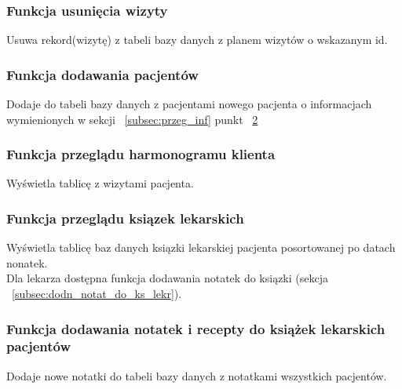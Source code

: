 \begin{flushleft}
    \subsubsection{\large{Funkcja usunięcia wizyty }\label{subsec:usun_wiz}}
    Usuwa rekord(wizytę) z tabeli bazy danych z planem wizytów o wskazanym id.
\end{flushleft}

\begin{flushleft}
    \subsubsection{\large{Funkcja dodawania pacjentów }\label{subsec:dodn_pacjn}}
    Dodaje do tabeli bazy danych z pacjentami nowego pacjenta o informacjach wymienionych w sekcji ~\ref{subsec:przeg_inf} punkt ~\hyperref[item:info]{2}
\end{flushleft}

\begin{flushleft}
    \subsubsection{\large{Funkcja przeglądu harmonogramu klienta}\label{subsec:wyst_harm_klnt}}
    Wyświetla tablicę z wizytami pacjenta.
\end{flushleft}

\begin{flushleft}
    \subsubsection{\large{Funkcja przeglądu ksiązek lekarskich}\label{subsec:przeg_ks_lekr}}
    Wyświetla tablicę baz danych ksiązki lekarskiej pacjenta posortowanej po datach nonatek.\\
    Dla lekarza dostępna funkcja dodawania notatek do ksiązki (sekcja ~\ref{subsec:dodn_notat_do_ks_lekr}).
\end{flushleft}

\begin{flushleft}
    \subsubsection{\large{Funkcja dodawania notatek i recepty do książek lekarskich pacjentów}\label{subsec:dodn_notat_do_ks_lekr}}
    Dodaje nowe notatki do tabeli bazy danych z notatkami wszystkich pacjentów.
\end{flushleft}

